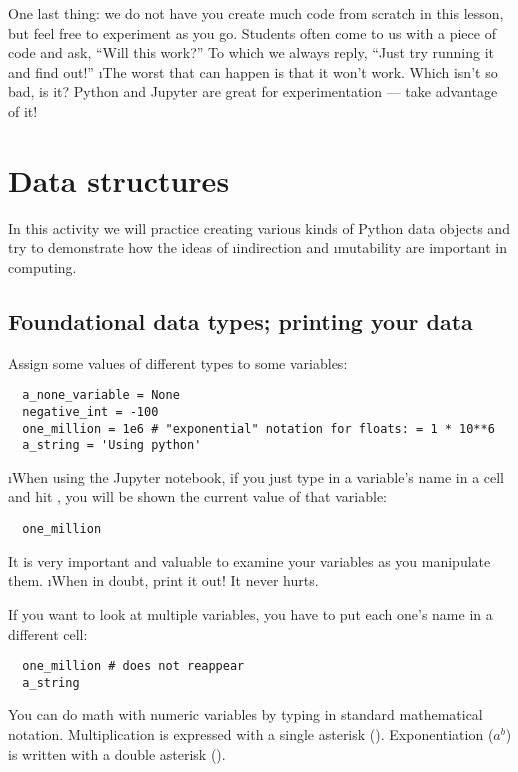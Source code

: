 \documentclass[letterpaper, 12pt, titlepage, twoside]{article}
\begin{document}
One last thing: we do not have you create much code from scratch in this
lesson, but feel free to experiment as you go. Students often come to us with
a piece of code and ask, ``Will this work?'' To which we always reply, ``Just
try running it and find out!'' \i{The worst that can happen is that it won't
  work}. Which isn't so bad, is it? Python and Jupyter are great for
experimentation --- take advantage of it!


\newpage
\section{Data structures}

In this activity we will practice creating various kinds of Python data
objects and try to demonstrate how the ideas of \i{indirection} and
\i{mutability} are important in computing.

\subsection*{Foundational data types; printing your data}

Assign some values of different types to some variables:

\begin{lstlisting}
  a_none_variable = None
  negative_int = -100
  one_million = 1e6 # "exponential" notation for floats: = 1 * 10**6
  a_string = 'Using python'
\end{lstlisting}

\i{When using the Jupyter notebook}, if you just type in a variable's name in
a cell and hit , you will be shown the current value of that
variable:

\begin{lstlisting}
  one_million
\end{lstlisting}

It is very important and valuable to examine your variables as you manipulate
them. \i{When in doubt, print it out!} It never hurts.

If you want to look at multiple variables, you have to put each one's name in
a different cell:

\begin{lstlisting}
  one_million # does not reappear
  a_string
\end{lstlisting}

You can do math with numeric variables by typing in standard mathematical
notation. Multiplication is expressed with a single asterisk (\s{*}).
Exponentiation ($a^b$) is written with a double asterisk ().
\end{document}
